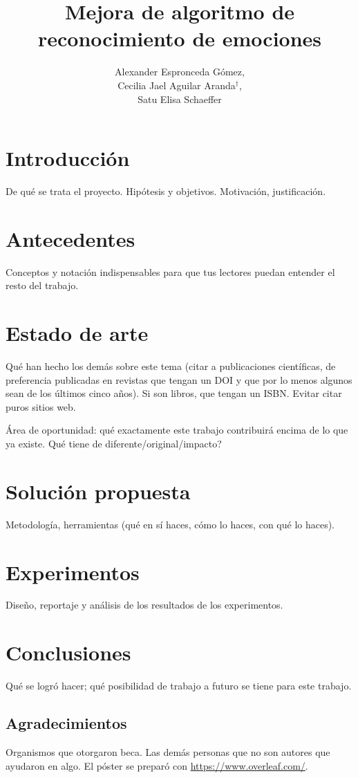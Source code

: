 \documentclass[a2]{sciposter} %
\title{Mejora de algoritmo de\\reconocimiento de emociones}
\author{Alexander Espronceda Gómez,\\Cecilia Jael Aguilar Aranda$^\dagger$,\\Satu Elisa Schaeffer}
\institute {Posgrado en Ingeniería de Sistemas}
\begin{document}

\maketitle

\section{Introducción}

De qué se trata el proyecto. Hipótesis y objetivos. Motivación,
justificación.

\section{Antecedentes}

Conceptos y notación indispensables para que tus lectores puedan
entender el resto del trabajo.

\section{Estado de arte}

Qué han hecho los demás sobre este tema (citar a publicaciones
científicas, de preferencia publicadas en revistas que tengan un DOI y
que por lo menos algunos sean de los últimos cinco años). Si son
libros, que tengan un ISBN. Evitar citar puros sitios web.

Área de oportunidad: qué exactamente este trabajo contribuirá encima
de lo que ya existe. {\textquestiondown}Qué tiene de
diferente/original/impacto?

\section{Solución propuesta}

Metodología, herramientas (qué en sí haces, cómo lo haces, con qué lo
haces).

\section{Experimentos}

Diseño, reportaje y análisis de los resultados de los experimentos.

\section{Conclusiones}

Qué se logró hacer; qué posibilidad de trabajo a futuro se tiene para
este trabajo.

\subsection*{Agradecimientos}

Organismos que otorgaron beca. Las demás personas que no son autores
que ayudaron en algo. El póster se preparó con
\url{https://www.overleaf.com/}.

\end{document}

